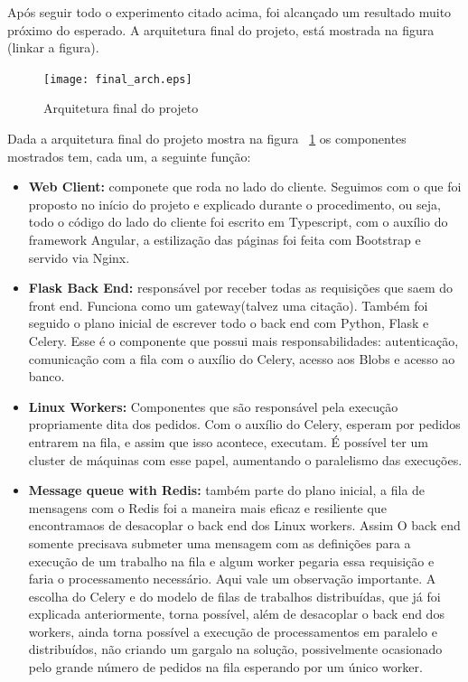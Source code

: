 \documentclass[11pt,twoside]{article}
\begin{document}
Após seguir todo o experimento citado acima, foi alcançado um resultado muito próximo do esperado. A arquitetura final do projeto, está mostrada na figura (linkar a figura).

\begin{figure}[!h]
  \centering
  \texttt{[image: final\_arch.eps]}
  \caption{Arquitetura final do projeto}
  \label{fig:finalArch}
\end{figure}

Dada a arquitetura final do projeto mostra na figura ~\ref{fig:finalArch} os componentes mostrados tem, cada um, a seguinte função:

\begin{itemize}
  \item \textbf{Web Client:} componete que roda no lado do cliente. Seguimos com o que foi proposto no início do projeto e explicado durante o procedimento, ou seja, todo o código do lado do cliente 
  foi escrito em Typescript, com o auxílio do framework Angular, a estilização das páginas foi feita com Bootstrap e servido via Nginx.
  \item \textbf{Flask Back End:} responsável por receber todas as requisições que saem do front end. Funciona como um gateway(talvez uma citação). Também foi seguido o plano inicial de escrever todo o back end com
  Python, Flask e Celery. Esse é o componente que possui mais responsabilidades: autenticação, comunicação com a fila com o auxílio do Celery, acesso aos Blobs e acesso ao banco.
  \item \textbf{Linux Workers:} Componentes que são responsável pela execução propriamente dita dos pedidos. Com o auxílio do Celery, esperam por pedidos entrarem na fila, e assim que isso acontece, executam. 
  É possível ter um cluster de máquinas com esse papel, aumentando o paralelismo das execuções.
  \item \textbf{Message queue with Redis:} também parte do plano inicial, a fila de mensagens com o Redis foi a maneira mais eficaz e resiliente que encontramaos de desacoplar o back end dos Linux workers. Assim
  O back end somente precisava submeter uma mensagem com as definições para a execução de um trabalho na fila e algum worker pegaria essa requisição e faria o processamento necessário. Aqui vale um observação 
  importante. A escolha do Celery e do modelo de filas de trabalhos distribuídas, que já foi explicada anteriormente, torna possível, além de desacoplar o back end dos workers, ainda torna possível a execução de
  processamentos em paralelo e distribuídos, não criando um gargalo na solução, possivelmente ocasionado pelo grande número de pedidos na fila esperando por um único worker.
  

\end{itemize}
\end{document}
